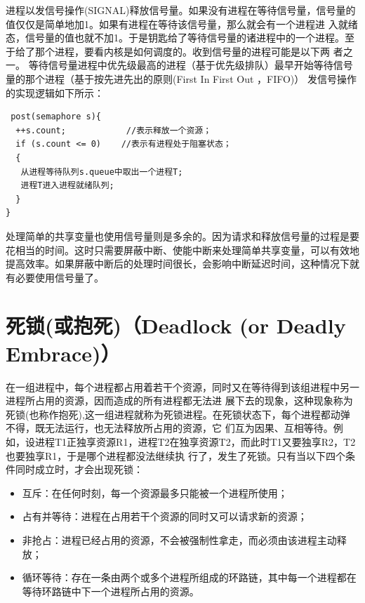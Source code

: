 \documentclass[a4paper,12pt]{report}
\begin{document}
\begin{appendix}
\begin{spacing}{1.5}
\begin{lstlisting}
   \end{lstlisting}

    进程以发信号操作(SIGNAL)释放信号量。如果没有进程在等待信号量，信号量的值仅仅是简单地加1。如果有进程在等待该信号量，那么就会有一个进程进 入就绪态，信号量的值也就不加1。于是钥匙给了等待信号量的诸进程中的一个进程。至于给了那个进程，要看内核是如何调度的。收到信号量的进程可能是以下两 者之一。
等待信号量进程中优先级最高的进程（基于优先级排队）最早开始等待信号量的那个进程（基于按先进先出的原则(First In First Out ，FIFO)）
 发信号操作的实现逻辑如下所示：

    \begin{lstlisting}
 post(semaphore s){
  ++s.count;            //表示释放一个资源；
  if (s.count <= 0)    //表示有进程处于阻塞状态；
  {
   从进程等待队列s.queue中取出一个进程T;
   进程T进入进程就绪队列;
  }
}
   \end{lstlisting}

处理简单的共享变量也使用信号量则是多余的。因为请求和释放信号量的过程是要花相当的时间。这时只需要屏蔽中断、使能中断来处理简单共享变量，可以有效地提高效率。如果屏蔽中断后的处理时间很长，会影响中断延迟时间，这种情况下就有必要使用信号量了。
\end{spacing}




\section{     死锁(或抱死)（Deadlock (or Deadly Embrace)）}
\begin{spacing}{1.5}

在一组进程中，每个进程都占用着若干个资源，同时又在等待得到该组进程中另一进程所占用的资源，因而造成的所有进程都无法进 展下去的现象，这种现象称为死锁(也称作抱死),这一组进程就称为死锁进程。在死锁状态下，每个进程都动弹不得，既无法运行，也无法释放所占用的资源，它 们互为因果、互相等待。例如，设进程T1正独享资源R1，进程T2在独享资源T2，而此时T1又要独享R2，T2也要独享R1，于是哪个进程都没法继续执 行了，发生了死锁。只有当以下四个条件同时成立时，才会出现死锁：
\begin{itemize}
  \item 互斥：在任何时刻，每一个资源最多只能被一个进程所使用；
  \item 占有并等待：进程在占用若干个资源的同时又可以请求新的资源；
  \item 非抢占：进程已经占用的资源，不会被强制性拿走，而必须由该进程主动释放；
  \item 循环等待：存在一条由两个或多个进程所组成的环路链，其中每一个进程都在等待环路链中下一个进程所占用的资源。


\end{itemize}
\end{spacing}
\end{appendix}
\end{document}
